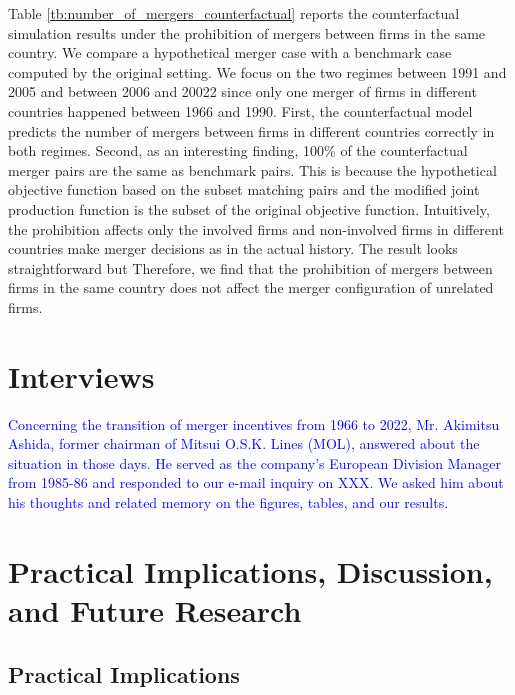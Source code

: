 \documentclass[10pt]{article}
\begin{document}
Table \ref{tb:number_of_mergers_counterfactual} reports the counterfactual simulation results under the prohibition of mergers between firms in the same country. 
We compare a hypothetical merger case with a benchmark case computed by the original setting.
We focus on the two regimes between 1991 and 2005 and between 2006 and 20022 since only one merger of firms in different countries happened between 1966 and 1990.
First, the counterfactual model predicts the number of mergers between firms in different countries correctly in both regimes. 
Second, as an interesting finding, 100\% of the counterfactual merger pairs are the same as benchmark pairs.
This is because the hypothetical objective function based on the subset matching pairs and the modified joint production function is the subset of the original objective function. 
Intuitively, the prohibition affects only the involved firms and non-involved firms in different countries make merger decisions as in the actual history.
The result looks straightforward but 
Therefore, we find that the prohibition of mergers between firms in the same country does not affect the merger configuration of unrelated firms.




\section{Interviews}\label{sec:interviews}

\textcolor{blue}{Concerning the transition of merger incentives from 1966 to 2022, Mr.
Akimitsu Ashida, former chairman of Mitsui O.S.K. Lines (MOL), answered about the situation in those days. He served as the company’s European Division Manager from 1985-86 and responded
to our e-mail inquiry on XXX. We asked him about his thoughts and related memory on the figures, tables, and our results.}



\section{Practical Implications, Discussion, and Future Research}\label{sec:practical_implications}

\subsection{Practical Implications}
\end{document}
